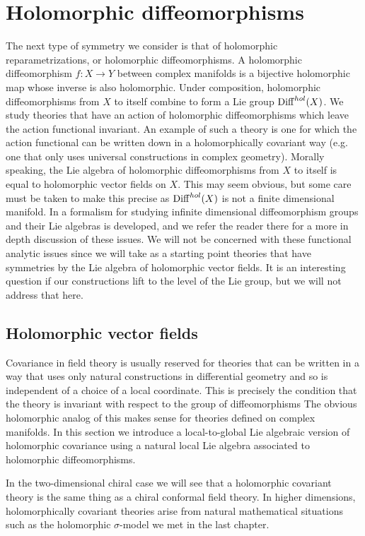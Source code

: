 \section{Holomorphic diffeomorphisms}

The next type of symmetry we consider is that of holomorphic reparametrizations, or holomorphic diffeomorphisms. 
A holomorphic diffeomorphism $f : X \to Y$ between complex manifolds is a bijective holomorphic map whose inverse is also holomorphic.
Under composition, holomorphic diffeomorphisms from $X$ to itself combine to form a Lie group ${\rm Diff}^{hol}(X)$.
We study theories that have an action of holomorphic diffeomorphisms which leave the action functional invariant.
An example of such a theory is one for which the action functional can be written down in a holomorphically covariant way (e.g. one that only uses universal constructions in complex geometry). 
Morally speaking, the Lie algebra of holomorphic diffeomorphisms from $X$ to itself is equal to holomorphic vector fields on $X$.
This may seem obvious, but some care must be taken to make this precise as ${\rm Diff}^{hol}(X)$ is not a finite dimensional manifold.
In \cite{KM97} a formalism for studying infinite dimensional diffeomorphism groups and their Lie algebras is developed, and we refer the reader there for a more in depth discussion of these issues.
We will not be concerned with these functional analytic issues since we will take as a starting point theories that have symmetries by the Lie algebra of holomorphic vector fields. 
It is an interesting question if our constructions lift to the level of the Lie group, but we will not address that here.

\subsection{Holomorphic vector fields}

Covariance in field theory is usually reserved for theories that can be written in a way that uses only natural constructions in differential geometry and so is independent of a choice of a local coordinate. 
This is precisely the condition that the theory is invariant with respect to the group of diffeomorphisms
The obvious holomorphic analog of this makes sense for theories defined on complex manifolds. 
In this section we introduce a local-to-global Lie algebraic version of holomorphic covariance using a natural local Lie algebra associated to holomorphic diffeomorphisms.

In the two-dimensional chiral case we will see that a holomorphic covariant theory is the same thing as a chiral conformal field theory.
In higher dimensions, holomorphically covariant theories arise from natural mathematical situations such as the holomorphic $\sigma$-model we met in the last chapter.


